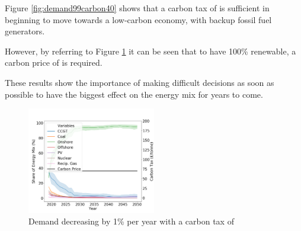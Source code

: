 Figure \ref{fig:demand99carbon40} shows that a carbon tax of  is sufficient in beginning to move towards a low-carbon economy, with backup fossil fuel generators.

However, by referring to Figure \ref{fig:demand99carbon70} it can be seen that to have 100\% renewable, a carbon price of  is required. 

These results show the importance of making difficult decisions as soon as possible to have the biggest effect on the energy mix for years to come.

\begin{figure}[h]
	\begin{center}
		\includegraphics[width=0.5\textwidth]{figures/scenarios/demand099-carbon70-datetime.png}
		\caption{Demand decreasing by 1\% per year with a carbon tax of }
		\label{fig:demand99carbon70}
	\end{center}
\end{figure}




